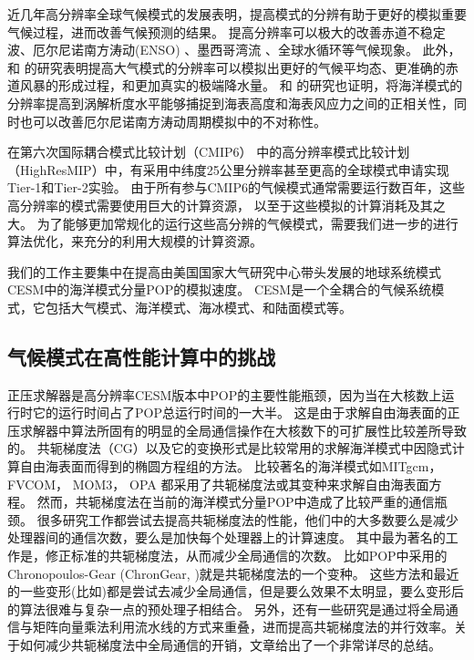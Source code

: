 近几年高分辨率全球气候模式的发展表明，提高模式的分辨有助于更好的模拟重要气候过程，进而改善气候预测的结果。
提高分辨率可以极大的改善赤道不稳定波\citep{roberts2009impact}、厄尔尼诺南方涛动(ENSO) \citep{shaffrey2009uk}、墨西哥湾流\citep{chassignet2008gulf, kuwano2010precipitation} 、全球水循环\citep{demory2014role}等气候现象。
此外，\cite{gent2010improvements} 和 \cite{wehner2014effect}的研究表明提高大气模式的分辨率可以模拟出更好的气候平均态、更准确的赤道风暴的形成过程，和更加真实的极端降水量。
 \cite{bryan2010frontal} 和 \cite{graham2014importance}的研究也证明，将海洋模式的分辨率提高到涡解析度水平能够捕捉到海表高度和海表风应力之间的正相关性，同时也可以改善厄尔尼诺南方涛动周期模拟中的不对称性。


在第六次国际耦合模式比较计划（CMIP6） 中的高分辨率模式比较计划（HighResMIP）中，有采用中纬度25公里分辨率甚至更高的全球模式申请实现Tier-1和Tier-2实验。 
由于所有参与CMIP6的气候模式通常需要运行数百年，这些高分辨率的模式需要使用巨大的计算资源， 以至于这些模拟的计算消耗及其之大。
为了能够更加常规化的运行这些高分辨的气候模式，需要我们进一步的进行算法优化，来充分的利用大规模的计算资源。

 
我们的工作主要集中在提高由美国国家大气研究中心带头发展的地球系统模式CESM中的海洋模式分量POP的模拟速度。 CESM是一个全耦合的气候系统模式，它包括大气模式、海洋模式、海冰模式、和陆面模式等。


\subsection{气候模式在高性能计算中的挑战}
 
正压求解器是高分辨率CESM版本中POP的主要性能瓶颈，因为当在大核数上运行时它的运行时间占了POP总运行时间的一大半。 
这是由于求解自由海表面的正压求解器中算法所固有的明显的全局通信操作在大核数下的可扩展性比较差所导致的。
共轭梯度法（CG）以及它的变换形式是比较常用的求解海洋模式中因隐式计算自由海表面而得到的椭圆方程组的方法。
比较著名的海洋模式如MITgcm\citep{adcroft2014mitgcm}， FVCOM\citep{lai2010nonhydrostatic}， MOM3\citep{pacanowsky1999mom3}， OPA \citep{madec1997ocean}
都采用了共轭梯度法或其变种来求解自由海表面方程。
然而，共轭梯度法在当前的海洋模式分量POP中造成了比较严重的通信瓶颈\citep{Worley:2011:PCE:2063384.2063457}。 
很多研究工作都尝试去提高共轭梯度法的性能，他们中的大多数要么是减少处理器间的通信次数，要么是加快每个处理器上的计算速度。
其中最为著名的工作是，修正标准的共轭梯度法，从而减少全局通信的次数。 比如POP中采用的Chronopoulos-Gear (ChronGear, \cite{dAzevedo1999lapack})就是共轭梯度法的一个变种。
这些方法和最近的一些变形(比如\cite{hoemmen2010})都是尝试去减少全局通信，但是要么效果不太明显，要么变形后的算法很难与复杂一点的预处理子相结合\citep{ghysels2014}。
另外，还有一些研究是通过将全局通信与矩阵向量乘法利用流水线的方式来重叠，进而提高共轭梯度法的并行效率。关于如何减少共轭梯度法中全局通信的开销，文章\cite{ghysels2014}给出了一个非常详尽的总结。

